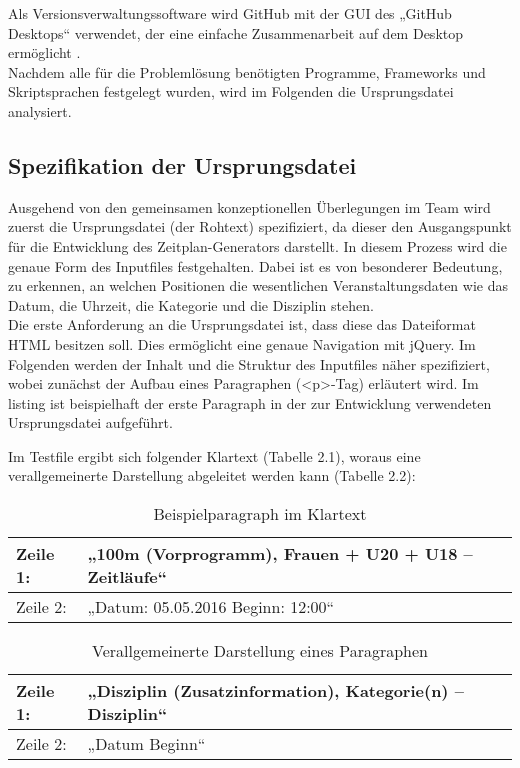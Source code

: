 Als Versionsverwaltungssoftware wird GitHub mit der \ac{GUI} des „GitHub Desktops“ verwendet, der eine einfache Zusammenarbeit auf dem Desktop ermöglicht \cite{github}.  \\
Nachdem alle für die Problemlösung benötigten Programme, Frameworks und Skriptsprachen festgelegt wurden, wird im Folgenden die Ursprungsdatei analysiert.

\subsection{Spezifikation der Ursprungsdatei}

Ausgehend von den gemeinsamen konzeptionellen Überlegungen im Team wird zuerst die Ursprungsdatei (der Rohtext) spezifiziert, da dieser den Ausgangspunkt für die Entwicklung des Zeitplan-Generators darstellt. In diesem Prozess wird die genaue Form des Inputfiles festgehalten. Dabei ist es von besonderer Bedeutung, zu erkennen, an welchen Positionen die wesentlichen Veranstaltungsdaten wie das Datum, die Uhrzeit, die Kategorie und die Disziplin stehen.\\
Die erste Anforderung an die Ursprungsdatei ist, dass diese das Dateiformat HTML besitzen soll. Dies ermöglicht eine genaue Navigation mit jQuery. Im Folgenden werden der Inhalt und die Struktur des Inputfiles näher spezifiziert, wobei zunächst der Aufbau eines Paragraphen (<p>-Tag) erläutert wird. Im listing ist beispielhaft der erste Paragraph in der zur Entwicklung verwendeten Ursprungsdatei aufgeführt. 
\lstset{language=html}

Im Testfile ergibt sich folgender Klartext (Tabelle 2.1), woraus eine verallgemeinerte Darstellung abgeleitet werden kann (Tabelle 2.2):\\
\begin{table}[h]
\caption{Beispielparagraph im Klartext}
\begin{tabular}{|l||l|}
\hline
Zeile 1: & „100m (Vorprogramm), Frauen + U20 + U18 – Zeitläufe“ \\
\hline
Zeile 2: & „Datum: 05.05.2016 Beginn: 12:00“ \\
\hline
\end{tabular}
\label{tab:Beispielparagraph im Klartext}
\end{table}
\begin{table}[h]
\caption{Verallgemeinerte Darstellung eines Paragraphen}
\begin{tabular}{|l||l|}
\hline
Zeile 1: & „Disziplin (Zusatzinformation), Kategorie(n) – Disziplin“ \\
\hline
Zeile 2: & „Datum Beginn“ \\
\hline
\end{tabular} 
\label{tab:Verallgemeinerte Darstellung eines Paragraphen}
\end{table}\\
